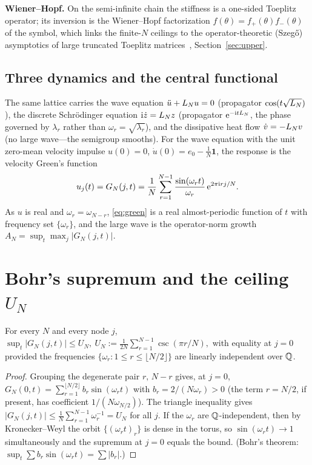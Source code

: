 \noindent\textbf{Wiener--Hopf.} On the semi-infinite chain the stiffness is a one-sided Toeplitz
operator; its inversion is the Wiener--Hopf factorization $f(\theta)=f_+(\theta)f_-(\theta)$ of the
symbol, which links the finite-$N$ ceilings to the operator-theoretic (Szeg\H{o}) asymptotics of large
truncated Toeplitz matrices~\cite{BS}, Section~\ref{sec:upper}.

\subsection{Three dynamics and the central functional}
The same lattice carries the wave equation $\ddot u+L_N u=0$ (propagator $\cos(t\sqrt{L_N})$), the
discrete Schr\"odinger equation $\mathrm i\dot z=L_N z$ (propagator $\mathrm{e}^{-\mathrm i tL_N}$, the phase
governed by $\lambda_r$ rather than $\omega_r=\sqrt{\lambda_r}$), and the dissipative heat flow
$\dot v=-L_N v$ (no large wave---the semigroup smooths). For the wave equation with the unit zero-mean
velocity impulse $u(0)=0$, $\dot u(0)=e_0-\tfrac1N\mathbf 1$, the response is the velocity Green's
function
\begin{equation}\label{eq:green}
  u_j(t)=G_N(j,t)=\frac1N\sum_{r=1}^{N-1}\frac{\sin(\omega_r t)}{\omega_r}\,\mathrm{e}^{2\pi\mathrm{i}rj/N}.
\end{equation}
As $u$ is real and $\omega_r=\omega_{N-r}$, \eqref{eq:green} is a real almost-periodic function of $t$
with frequency set $\{\omega_r\}$, and the large wave is the operator-norm growth
$A_N=\sup_t\max_j|G_N(j,t)|$.

\section{Bohr's supremum and the ceiling \texorpdfstring{$U_N$}{U\_N}}

\begin{proposition}\label{prop:bohr}
For every $N$ and every node $j$,
\(
  \sup_t|G_N(j,t)|\le U_N,\ U_N:=\tfrac1{2N}\sum_{r=1}^{N-1}\csc(\pi r/N),
\)
with equality at $j=0$ provided the frequencies $\{\omega_r:1\le r\le\lfloor N/2\rfloor\}$ are
linearly independent over $\mathbb{Q}$.
\end{proposition}

\begin{proof}
Grouping the degenerate pair $r,\,N-r$ gives, at $j=0$,
$G_N(0,t)=\sum_{r=1}^{\lfloor N/2\rfloor}b_r\sin(\omega_r t)$ with $b_r=2/(N\omega_r)>0$
(the term $r=N/2$, if present, has coefficient $1/(N\omega_{N/2})$). The triangle inequality
gives $|G_N(j,t)|\le\frac1N\sum_{r=1}^{N-1}\omega_r^{-1}=U_N$ for all $j$. If the $\omega_r$ are
$\mathbb{Q}$-independent, then by Kronecker--Weyl the orbit $\{(\omega_r t)_r\}$ is dense in the torus, so
$\sin(\omega_r t)\to1$ simultaneously and the supremum at $j=0$ equals the bound. (Bohr's theorem:
$\sup_t\sum b_r\sin(\omega_r t)=\sum|b_r|$.)
\end{proof}

